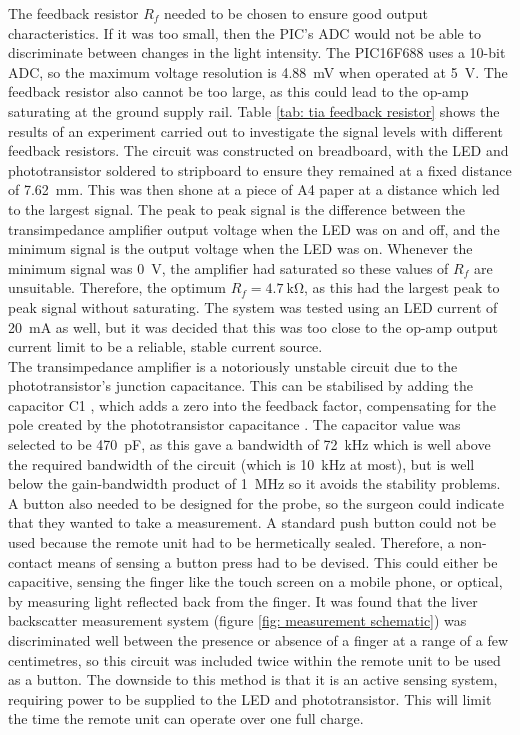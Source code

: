 The feedback resistor $R_f$ needed to be chosen to ensure good output characteristics. If it was too small, then the PIC's ADC would not be able to discriminate between changes in the light intensity.  The PIC16F688 uses a 10-bit ADC, so the maximum voltage resolution is \SI{4.88}{\milli\volt} when operated at \SI{5}{\volt}. The feedback resistor also cannot be too large, as this could lead to the op-amp saturating at the ground supply rail. Table \ref{tab: tia feedback resistor} shows the results of an experiment carried out to investigate the signal levels with different feedback resistors. The circuit was constructed on breadboard, with the LED and phototransistor soldered to stripboard to ensure they remained at a fixed distance of \SI{7.62}{\milli\metre}. This was then shone at a piece of A4 paper at a distance which led to the largest signal. The peak to peak signal is the difference between the transimpedance amplifier output voltage when the LED was on and off, and the minimum signal is the output voltage when the LED was on. Whenever the minimum signal was \SI{0}{\volt}, the amplifier had saturated so these values of $R_f$ are unsuitable. Therefore, the optimum $R_f = \SI{4.7}{\kilo\ohm}$, as this had the largest peak to peak signal without saturating. The system was tested using an LED current of \SI{20}{\milli\ampere} as well, but it was decided that this was too close to the op-amp output current limit to be a reliable, stable current source.\\


The transimpedance amplifier is a notoriously unstable circuit due to the phototransistor's junction capacitance. This can be stabilised by adding the capacitor C1 \cite{tia_stability}, which adds a zero into the feedback factor, compensating for the pole created by the phototransistor capacitance \cite{tia_stability}. The capacitor value was selected to be \SI{470}{\pico\farad}, as this gave a bandwidth of \SI{72}{\kilo\hertz} which is well above the required bandwidth of the circuit (which is \SI{10}{\kilo\hertz} at most), but is well below the gain-bandwidth product of \SI{1}{\mega\hertz} so it avoids the stability problems.\\

A button also needed to be designed for the probe, so the surgeon could indicate that they wanted to take a measurement. A standard push button could not be used because the remote unit had to be hermetically sealed. Therefore, a non-contact means of sensing a button press had to be devised. This could either be capacitive, sensing the finger like the touch screen on a mobile phone, or optical, by measuring light reflected back from the finger. It was found that the liver backscatter measurement system (figure \ref{fig: measurement schematic}) was discriminated well between the presence or absence of a finger at a range of a few centimetres, so this circuit was included twice within the remote unit to be used as a button. The downside to this method is that it is an active sensing system, requiring power to be supplied to the LED and phototransistor. This will limit the time the remote unit can operate over one full charge. \\

